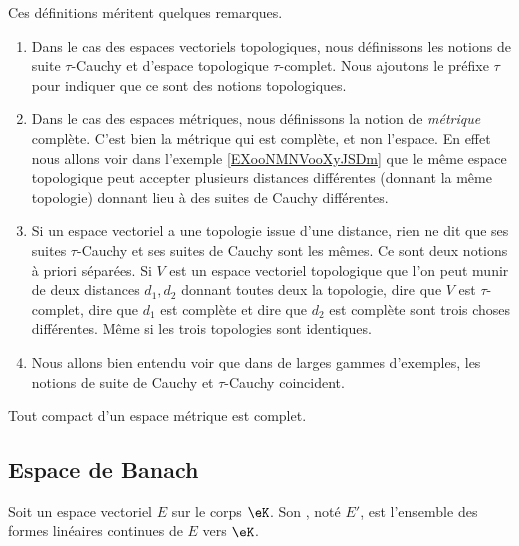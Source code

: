 \begin{normaltext}
	Ces définitions méritent quelques remarques.
	\begin{enumerate}
		\item
		      Dans le cas des espaces vectoriels topologiques, nous définissons les notions de suite \( \tau\)-Cauchy et d'espace topologique \( \tau\)-complet. Nous ajoutons le préfixe \( \tau\) pour indiquer que ce sont des notions topologiques.
		\item
		      Dans le cas des espaces métriques, nous définissons la notion de \emph{métrique} complète. C'est bien la métrique qui est complète, et non l'espace. En effet nous allons voir dans l'exemple \ref{EXooNMNVooXyJSDm} que le même espace topologique peut accepter plusieurs distances différentes (donnant la même topologie) donnant lieu à des suites de Cauchy différentes.
		\item
		      Si un espace vectoriel a une topologie issue d'une distance, rien ne dit que ses suites \( \tau\)-Cauchy et ses suites de Cauchy sont les mêmes. Ce sont deux notions à priori séparées. Si \( V\) est un espace vectoriel topologique que l'on peut munir de deux distances \( d_1, d_2\) donnant toutes deux la topologie, dire que \( V\) est \( \tau\)-complet, dire que \( d_1\) est complète et dire que \( d_2\) est complète sont trois choses différentes. Même si les trois topologies sont identiques.
		\item
		      Nous allons bien entendu voir que dans de larges gammes d'exemples, les notions de suite de Cauchy et \( \tau\)-Cauchy coincident.
	\end{enumerate}
\end{normaltext}


\begin{proposition}	\label{PROPooTGCKooRsmoLx}
	Tout compact d'un espace métrique est complet.
\end{proposition}

\subsection{Espace de Banach}

\begin{definition}      \label{DEFooKSDFooGIBtrG}
	Soit un espace vectoriel \( E\) sur le corps \( \eK\). Son , noté \( E'\), est l'ensemble des formes linéaires continues de \( E\) vers \( \eK\).
\end{definition}


